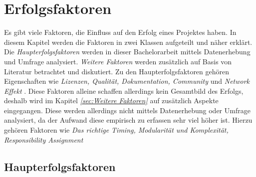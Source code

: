 \chapter{Erfolgsfaktoren}


\bigskip

\noindent
Es gibt viele Faktoren, die Einfluss auf den Erfolg eines Projektes haben. 
In diesem Kapitel werden die Faktoren in zwei Klassen aufgeteilt und näher erklärt.
Die \textit{Haupterfolgsfaktoren} werden in dieser Bachelorarbeit mittels Datenerhebung und
Umfrage analysiert. 
\textit{Weitere Faktoren} werden zusätzlich auf Basis von Literatur betrachtet und diskutiert.
Zu den Haupterfolgsfaktoren gehören Eigenschaften wie \textit{Lizenzen, Qualität, Dokumentation, Community} 
und \textit{Network Effekt} .
Diese Faktoren alleine schaffen allerdings kein Gesamtbild des Erfolgs, deshalb wird im Kapitel 
\textit{\ref{sec:Weitere Faktoren}} auf zusätzlich Aspekte eingegangen.
Diese werden allerdings nicht mittels Datenerhebung oder Umfrage analysiert, da der Aufwand
diese empirisch zu erfassen sehr viel höher ist. 
Hierzu gehören Faktoren wie \textit{Das richtige Timing, Modularität und Komplexität, Responsibility
Assignment} 


\section{Haupterfolgsfaktoren} \label{sec:Haupterfolgsfaktoren}







